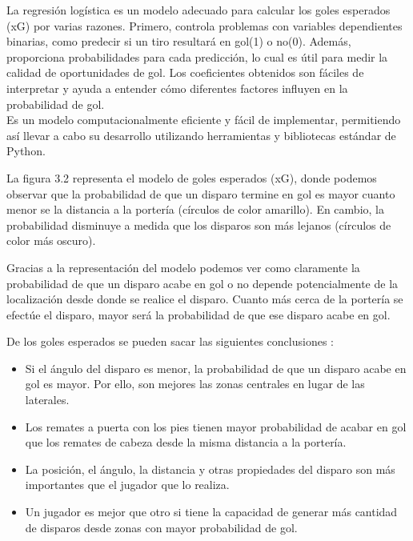 La regresión logística es un modelo adecuado para calcular los goles esperados (xG) por varias razones. Primero, controla problemas con variables dependientes binarias, como predecir si un tiro resultará en gol(1) o no(0). Además, proporciona probabilidades para cada predicción, lo cual es útil para medir la calidad de oportunidades de gol. Los coeficientes obtenidos son fáciles de interpretar y ayuda a entender cómo diferentes factores influyen en la probabilidad de gol. \\
Es un modelo computacionalmente eficiente y fácil de implementar, permitiendo así llevar a cabo su desarrollo utilizando herramientas y bibliotecas estándar de Python.

La figura 3.2 representa el modelo de goles esperados (xG), donde podemos observar que la probabilidad de que un disparo termine en gol es mayor cuanto menor se la distancia a la portería (círculos de color amarillo). En cambio, la probabilidad disminuye a medida que los disparos son más lejanos (círculos de color más oscuro).


Gracias a la representación del modelo podemos ver como claramente la probabilidad de que un disparo acabe en gol o no depende potencialmente de la localización desde donde se realice el disparo. Cuanto más cerca de la portería se efectúe el disparo, mayor será la probabilidad de que ese disparo acabe en gol.

De los goles esperados se pueden sacar las siguientes conclusiones \cite{xG:latex}:
\begin{itemize}
    \item Si el ángulo del disparo es menor, la probabilidad de que un disparo acabe en gol es mayor. Por ello, son mejores las zonas centrales en lugar de las laterales.
    \item Los remates a puerta con los pies tienen mayor probabilidad de acabar en gol que los remates de cabeza desde la misma distancia a la portería.
    \item La posición, el ángulo, la distancia y otras propiedades del disparo son más importantes que el jugador que lo realiza. 
    \item Un jugador es mejor que otro si tiene la capacidad de generar más cantidad de disparos desde zonas con mayor probabilidad de gol.
\end{itemize} 


